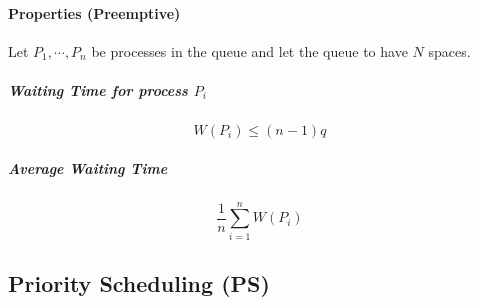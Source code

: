 				\paragraph{Properties (Preemptive)}
					Let \( P_1, \cdots, P_n \) be processes in the queue and let the queue to have \(N\) spaces.

					\subparagraph{Waiting Time for process \(P_i\)}
						\begin{equation*}
							W(P_i) \leq (n - 1)q
						\end{equation*}

					\subparagraph{Average Waiting Time}
						\begin{equation*}
							\frac{1}{n} \sum_{i = 1}^{n} W(P_i)
						\end{equation*}

		\subsection{Priority Scheduling (PS)}
